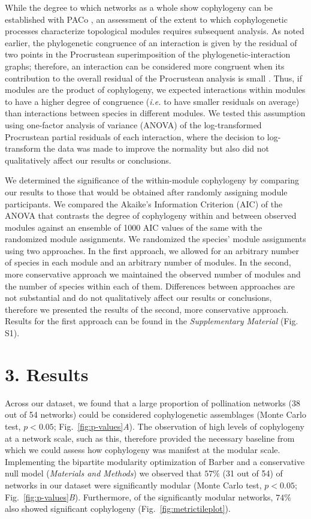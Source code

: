 \documentclass{article}
\begin{document}
	While the degree to which networks as a whole show cophylogeny can be established with PACo \citep{Balbuena2013, Cagua2015}, an assessment of the extent to which cophylogenetic processes characterize topological modules requires subsequent analysis. As noted earlier, the phylogenetic congruence of an interaction is given by the residual of two points in the Procrustean superimposition of the phylogenetic-interaction graphs; therefore, an interaction can be considered more congruent when its contribution to the overall residual of the Procrustean analysis is small \citep{Balbuena2013}. Thus, if modules are the product of cophylogeny, we expected interactions within modules to have a higher degree of congruence (\emph{i.e.} to have smaller residuals on average) than interactions between species in different modules. We tested this assumption using one-factor analysis of variance (ANOVA) of the log-transformed Procrustean partial residuals of each interaction, where the decision to log-transform the data was made to improve the normality but also did not qualitatively affect our results or conclusions.
 	
	We determined the significance of the within-module cophylogeny by comparing our results to those that would be obtained after randomly assigning module participants. We compared the Akaike's Information Criterion (AIC) of the ANOVA that contrasts the degree of cophylogeny within and between observed modules against an ensemble of 1000 AIC values of the same with the randomized module assignments. We randomized the species' module assignments using two approaches. In the first approach, we allowed for an arbitrary number of species in each module and an arbitrary number of modules. In the second, more conservative approach we maintained the observed number of modules and the number of species within each of them. Differences between approaches are not substantial and do not qualitatively affect our results or conclusions, therefore we presented the results of the second, more conservative approach. Results for the first approach can be found in the \emph{Supplementary Material} (Fig. S1).

\section*{3. Results}
	
	 Across our dataset, we found that a large proportion of pollination networks (38 out of 54 networks) could be considered cophylogenetic assemblages (Monte Carlo test, $p<0.05$; Fig.\ \ref{fig:p-values}\emph{A}). The observation of high levels of cophylogeny at a network scale, such as this, therefore provided the necessary baseline from which we could assess how cophylogeny was manifest at the modular scale. Implementing the bipartite modularity optimization of Barber \citep{Barber2007} and a conservative null model (\emph{Materials and Methods}) we observed that $57\%$ (31 out of 54) of networks in our dataset were significantly modular (Monte Carlo test, $p<0.05$; Fig.\ \ref{fig:p-values}\emph{B}). Furthermore, of the significantly modular networks, $74\%$ also showed significant cophylogeny (Fig.\ \ref{fig:metrictileplot}). %
	
\end{document}
